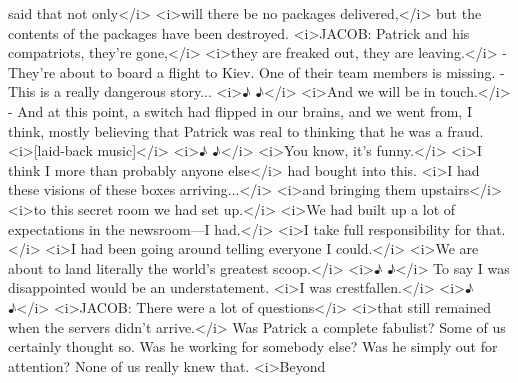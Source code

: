 \begin{itemize}
\begin{itemize}
    said that not only\textless{}/i\textgreater{}
    \textless{}i\textgreater{}will there be no packages
    delivered,\textless{}/i\textgreater{} but the contents of the
    packages have been destroyed. \textless{}i\textgreater{}JACOB:
    Patrick and his compatriots, they're
    gone,\textless{}/i\textgreater{} \textless{}i\textgreater{}they are
    freaked out, they are leaving.\textless{}/i\textgreater{} - They're
    about to board a flight to Kiev. One of their team members is
    missing. - This is a really dangerous story...
    \textless{}i\textgreater{}♪ ♪\textless{}/i\textgreater{}
    \textless{}i\textgreater{}And we will be in
    touch.\textless{}/i\textgreater{} - And at this point, a switch had
    flipped in our brains, and we went from, I think, mostly believing
    that Patrick was real to thinking that he was a fraud.
    \textless{}i\textgreater{}{[}laid-back
    music{]}\textless{}/i\textgreater{} \textless{}i\textgreater{}♪
    ♪\textless{}/i\textgreater{} \textless{}i\textgreater{}You know,
    it's funny.\textless{}/i\textgreater{} \textless{}i\textgreater{}I
    think I more than probably anyone else\textless{}/i\textgreater{}
    had bought into this. \textless{}i\textgreater{}I had these visions
    of these boxes arriving...\textless{}/i\textgreater{}
    \textless{}i\textgreater{}and bringing them
    upstairs\textless{}/i\textgreater{} \textless{}i\textgreater{}to
    this secret room we had set up.\textless{}/i\textgreater{}
    \textless{}i\textgreater{}We had built up a lot of expectations in
    the newsroom---I had.\textless{}/i\textgreater{}
    \textless{}i\textgreater{}I take full responsibility for
    that.\textless{}/i\textgreater{} \textless{}i\textgreater{}I had
    been going around telling everyone I
    could.\textless{}/i\textgreater{} \textless{}i\textgreater{}We are
    about to land literally the world's greatest
    scoop.\textless{}/i\textgreater{} \textless{}i\textgreater{}♪
    ♪\textless{}/i\textgreater{} To say I was disappointed would be an
    understatement. \textless{}i\textgreater{}I was
    crestfallen.\textless{}/i\textgreater{} \textless{}i\textgreater{}♪
    ♪\textless{}/i\textgreater{} \textless{}i\textgreater{}JACOB: There
    were a lot of questions\textless{}/i\textgreater{}
    \textless{}i\textgreater{}that still remained when the servers
    didn't arrive.\textless{}/i\textgreater{} Was Patrick a complete
    fabulist? Some of us certainly thought so. Was he working for
    somebody else? Was he simply out for attention? None of us really
    knew that. \textless{}i\textgreater{}Beyond

\end{itemize}
\end{itemize}
